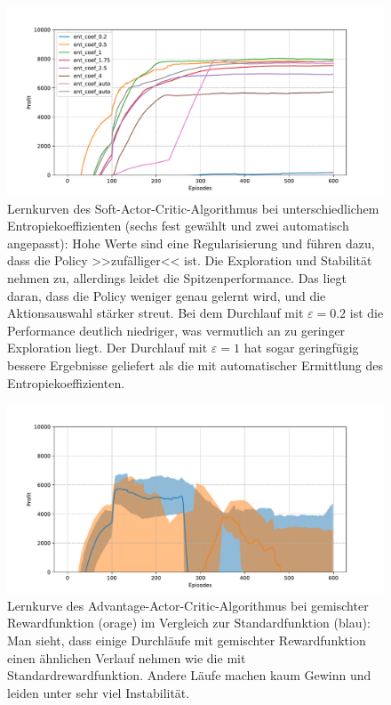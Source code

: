 \begin{figure}[htb]
	\centering
	\includegraphics[width=\textwidth]{appendix/sac_temperature.pdf}
	\caption{
		Lernkurven des Soft-Actor-Critic-Algorithmus bei unterschiedlichem Entropiekoeffizienten (sechs fest gewählt und zwei automatisch angepasst):
        Hohe Werte sind eine Regularisierung und führen dazu, dass die Policy >>zufälliger<< ist.
        Die Exploration und Stabilität nehmen zu, allerdings leidet die Spitzenperformance.
        Das liegt daran, dass die Policy weniger genau gelernt wird, und die Aktionsauswahl stärker streut.
        Bei dem Durchlauf mit $\varepsilon=0.2$ ist die Performance deutlich niedriger, was vermutlich an zu geringer Exploration liegt.
        Der Durchlauf mit $\varepsilon=1$ hat sogar geringfügig bessere Ergebnisse geliefert als die mit automatischer Ermittlung des Entropiekoeffizienten.
	}
	\label{graphic:SACTemperature}
\end{figure}
\begin{figure}[htb]
	\centering
	\includegraphics[width=\textwidth]{appendix/mixed_rewards_a2c.pdf}
	\caption{
		Lernkurve des Advantage-Actor-Critic-Algorithmus bei gemischter Rewardfunktion (orage) im Vergleich zur Standardfunktion (blau):
		Man sieht, dass einige Durchläufe mit gemischter Rewardfunktion einen ähnlichen Verlauf nehmen wie die mit Standardrewardfunktion.
		Andere Läufe machen kaum Gewinn und leiden unter sehr viel Instabilität.
	}
	\label{graphic:MixedRewardsA2C}
\end{figure}
